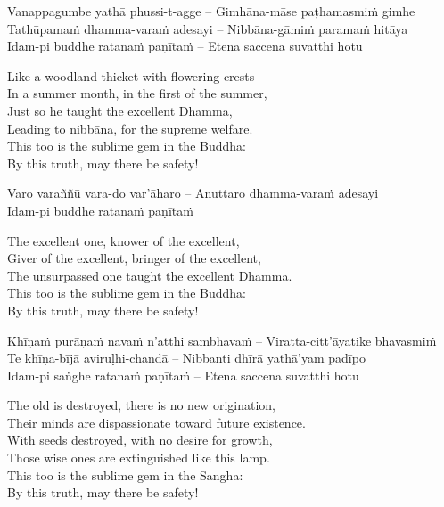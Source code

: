 Vanappagumbe yathā phussi-t-agge – Gimhāna-māse paṭhamasmiṁ gimhe\\
Tathūpamaṁ dhamma-varaṁ adesayi – Nibbāna-gāmiṁ paramaṁ hitāya\\
Idam-pi buddhe ratanaṁ paṇītaṁ – Etena saccena suvatthi hotu

\begin{english}
  Like a woodland thicket with flowering crests\\
  In a summer month, in the first of the summer,\\
  Just so he taught the excellent Dhamma,\\
  Leading to nibbāna, for the supreme welfare.\\
  This too is the sublime gem in the Buddha:\\
  By this truth, may there be safety!
\end{english}

Varo varaññū vara-do var'āharo – Anuttaro dhamma-varaṁ adesayi\\
Idam-pi buddhe ratanaṁ paṇītaṁ

\begin{english}
  The excellent one, knower of the excellent,\\
  Giver of the excellent, bringer of the excellent,\\
  The unsurpassed one taught the excellent Dhamma.\\
  This too is the sublime gem in the Buddha:\\
  By this truth, may there be safety!
\end{english}

Khīṇaṁ purāṇaṁ navaṁ n'atthi sambhavaṁ – Viratta-citt'āyatike bhavasmiṁ\\
Te khīṇa-bījā aviruḷhi-chandā – Nibbanti dhīrā yathā'yam padīpo\\
Idam-pi saṅghe ratanaṁ paṇītaṁ – Etena saccena suvatthi hotu

\begin{english}
  The old is destroyed, there is no new origination,\\
  Their minds are dispassionate toward future existence.\\
  With seeds destroyed, with no desire for growth,\\
  Those wise ones are extinguished like this lamp.\\
  This too is the sublime gem in the Sangha:\\
  By this truth, may there be safety!
\end{english}

